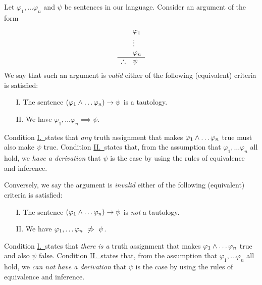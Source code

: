 \begin{definition}[Validity]
    Let $\varphi_1, \dots \varphi_n$ and $\psi$ be sentences in our language.
    Consider an argument of the form
    \[
    \begin{array}{ r l }
                & \varphi_1 \\
                & \vdots \\
                & \varphi_n \\
        \cline{1-2}
        \therefore & \psi
    \end{array}
    \]
    We say that such an argument is \emph{valid} \iffbydefn
    either of the following (equivalent) criteria is satisfied:
    \begin{enumerate}
        \item[I.]\label{validi}
            The sentence
            $\pn*{\varphi_1 \meet \dots \varphi_n} \rightarrow \psi$
            is a tautology.
        \item[II.]\label{validii}
            We have $\varphi_1, \dots \varphi_n \implies \psi$.
    \end{enumerate}
    Condition \hyperref[validi]{I.\ }states that \emph{any} truth assignment
    that makes $\varphi_1 \wedge \dots \varphi_n$ true must also make $\psi$ true.
    Condition \hyperref[validi]{II.\ }states that,
    from the assumption that $\varphi_1, \dots \varphi_n$ all hold,
    we \emph{have a derivation}
    that $\psi$ is the case by using the rules of equivalence and inference.
\end{definition}

\begin{definition}[Invalidity]
    Conversely, we say the argument is \emph{invalid} \iffbydefn
    either of the following (equivalent) criteria is satisfied: 
    \begin{enumerate}
        \item[I.]
            The sentence
            $\pn*{\varphi_1 \meet \dots \varphi_n} \rightarrow \psi$
            is \emph{not} a tautology.
        \item[II.]
            We have $\varphi_1, \dots \varphi_n ~\not\Rightarrow~ \psi$.
    \end{enumerate}
    Condition \hyperref[validi]{I.\ }states that \emph{there is a} truth assignment
    that makes $\varphi_1 \wedge \dots \varphi_n$ true and also $\psi$ false.
    Condition \hyperref[validi]{II.\ }states that,
    from the assumption that $\varphi_1, \dots \varphi_n$ all hold,
    we \emph{can not have a derivation}
    that $\psi$ is the case by using the rules of equivalence and inference.
\end{definition}

